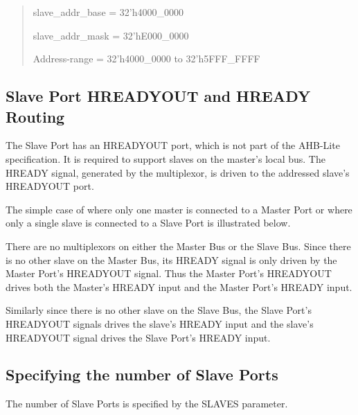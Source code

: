 \begin{quote}
slave\_addr\_base = 32'h4000\_0000

slave\_addr\_mask = 32'hE000\_0000

Address-range = 32'h4000\_0000 to 32'h5FFF\_FFFF
\end{quote}

\subsection{Slave Port HREADYOUT and HREADY
Routing}\label{slave-port-hreadyout-and-hready-routing}

The Slave Port has an HREADYOUT port, which is not part of the AHB-Lite
specification. It is required to support slaves on the master's local
bus. The HREADY signal, generated by the multiplexor, is driven to the
addressed slave's HREADYOUT port.


The simple case of where only one master is connected to a Master Port
or where only a single slave is connected to a Slave Port is illustrated
below.

There are no multiplexors on either the Master Bus or the Slave Bus.
Since there is no other slave on the Master Bus, its HREADY signal is
only driven by the Master Port's HREADYOUT signal. Thus the Master
Port's HREADYOUT drives both the Master's HREADY input and the Master
Port's HREADY input.

Similarly since there is no other slave on the Slave Bus, the Slave
Port's HREADYOUT signals drives the slave's HREADY input and the slave's
HREADYOUT signal drives the Slave Port's HREADY input.


\subsection{Specifying the number of Slave
Ports}\label{specifying-the-number-of-slave-ports}

The number of Slave Ports is specified by the SLAVES parameter.
